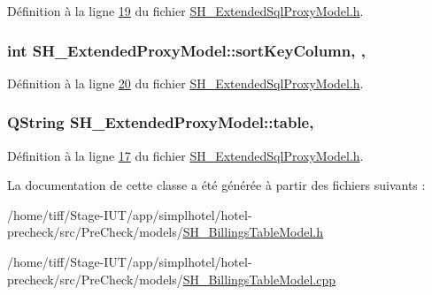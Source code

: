 Définition à la ligne \hyperlink{SH__ExtendedSqlProxyModel_8h_source_l00019}{19} du fichier \hyperlink{SH__ExtendedSqlProxyModel_8h_source}{S\-H\-\_\-\-Extended\-Sql\-Proxy\-Model.\-h}.

\hypertarget{classSH__ExtendedProxyModel_a47e2d0b99b84fb066438db667dd1ad26}{
\subsubsection[{sort\-Key\-Column}]{\setlength{\rightskip}{0pt plus 5cm}int S\-H\-\_\-\-Extended\-Proxy\-Model\-::sort\-Key\-Column\hspace{0.3cm}{\ttfamily [read]}, {\ttfamily [write]}, {\ttfamily [inherited]}}}\label{classSH__ExtendedProxyModel_a47e2d0b99b84fb066438db667dd1ad26}


Définition à la ligne \hyperlink{SH__ExtendedSqlProxyModel_8h_source_l00020}{20} du fichier \hyperlink{SH__ExtendedSqlProxyModel_8h_source}{S\-H\-\_\-\-Extended\-Sql\-Proxy\-Model.\-h}.

\hypertarget{classSH__ExtendedProxyModel_a7eef4557a77444e9ce5c24c180392bfa}{
\subsubsection[{table}]{\setlength{\rightskip}{0pt plus 5cm}Q\-String S\-H\-\_\-\-Extended\-Proxy\-Model\-::table\hspace{0.3cm}{\ttfamily [read]}, {\ttfamily [inherited]}}}\label{classSH__ExtendedProxyModel_a7eef4557a77444e9ce5c24c180392bfa}


Définition à la ligne \hyperlink{SH__ExtendedSqlProxyModel_8h_source_l00017}{17} du fichier \hyperlink{SH__ExtendedSqlProxyModel_8h_source}{S\-H\-\_\-\-Extended\-Sql\-Proxy\-Model.\-h}.



La documentation de cette classe a été générée à partir des fichiers suivants \-:\begin{DoxyCompactItemize}
\item 
/home/tiff/\-Stage-\/\-I\-U\-T/app/simplhotel/hotel-\/precheck/src/\-Pre\-Check/models/\hyperlink{SH__BillingsTableModel_8h}{S\-H\-\_\-\-Billings\-Table\-Model.\-h}\item 
/home/tiff/\-Stage-\/\-I\-U\-T/app/simplhotel/hotel-\/precheck/src/\-Pre\-Check/models/\hyperlink{SH__BillingsTableModel_8cpp}{S\-H\-\_\-\-Billings\-Table\-Model.\-cpp}\end{DoxyCompactItemize}

